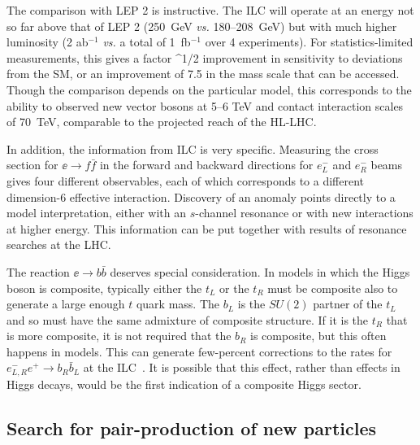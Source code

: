 The comparison with LEP 2 is instructive.   The ILC will operate at an energy not so far above that of LEP 2  (250~GeV {\it vs.}  180--208~GeV)  but with much higher luminosity (2 ab$^{-1}$  {\it vs.} a total of 1~fb$^{-1}$ over 4 experiments).   For statistics-limited measurements, this gives a factor 
\beq
   ^{1/2}  
\eeqn
improvement in sensitivity to deviations from the SM, or an improvement of  7.5 in the mass scale that can be accessed.   Though the comparison depends on the particular model, this corresponds to the ability to observed new vector bosons at 5--6 TeV and 
contact interaction scales of 70~TeV, comparable to  the projected reach of the HL-LHC. 

 In addition, the information from ILC is very specific.   Measuring the cross section for $\ee\to f\bar f$ in the forward and backward directions for $e^-_L$ and $e^-_R$ beams gives four  different observables, each of which corresponds to a different dimension-6 effective  interaction.   Discovery of an anomaly points directly to a model interpretation, either with an $s$-channel resonance or with new interactions at higher energy.   This information can be put together with results of resonance searches at the LHC. 

The reaction $\ee\to b\bar b$ deserves special consideration. In models in which the Higgs boson is composite, typically either the $t_L$ or the $t_R$ must be composite also to generate a large enough $t$ quark mass.    The $b_L$ is the $SU(2)$ partner of the $t_L$ and so must have the same admixture of composite structure.    If it is the $t_R$ that is more composite, it is not required that the $b_R$ is composite, but this often happens in models.  This can generate few-percent corrections to the rates for $e^-_{L,R} e^+\to b_R\bar b_L$ at the ILC~\cite{Funatsu:2017nfm,Yoon:2018xud}.   It is possible that this effect, rather than effects in Higgs decays, would be the first indication of a composite Higgs sector. 

     
\subsection{Search for pair-production of new particles}

